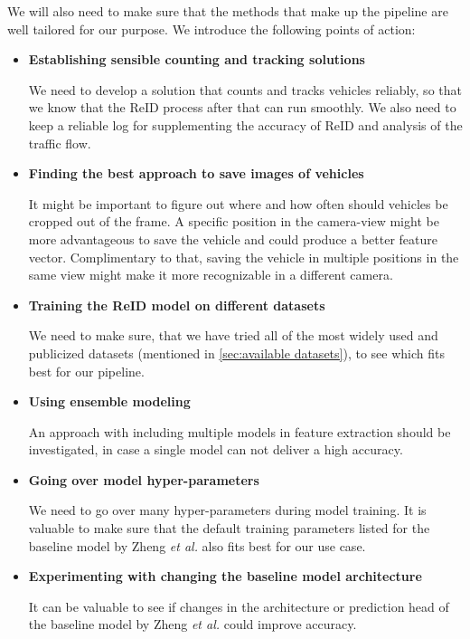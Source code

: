 \documentclass[conference]{IEEEtran} %
\begin{document}
		We will also need to make sure that the methods that make up the pipeline are well tailored for our purpose. We introduce the following points of action:
		\begin{itemize}
			\item \textbf{Establishing sensible counting and tracking solutions}

			We need to develop a solution that counts and tracks vehicles reliably, so that we know that the ReID process after that can run smoothly. We also need to keep a reliable log for supplementing the accuracy of ReID and analysis of the traffic flow.
			
			\item \textbf{Finding the best approach to save images of vehicles}

			It might be important to figure out where and how often should vehicles be cropped out of the frame. A specific position in the camera-view might be more advantageous to save the vehicle and could produce a better feature vector. Complimentary to that, saving the vehicle in multiple positions in the same view might make it more recognizable in a different camera.
			
			\item \textbf{Training the ReID model on different datasets}
			
			We need to make sure, that we have tried all of the most widely used and publicized datasets (mentioned in \ref{sec:available datasets}), to see which fits best for our pipeline.
			
			\item \textbf{Using ensemble modeling}

			An approach with including multiple models in feature extraction should be investigated, in case a single model can not deliver a high accuracy.
			
			\item \textbf{Going over model hyper-parameters}
			
			We need to go over many hyper-parameters during model training. It is valuable to make sure that the default training parameters listed for the baseline model by Zheng \textit{et al.} also fits best for our use case.
			
			\item \textbf{Experimenting with changing the baseline model architecture}

			It can be valuable to see if changes in the architecture or prediction head of the baseline model by Zheng \textit{et al.} could improve accuracy.
			
		\end{itemize}
				
\end{document}
